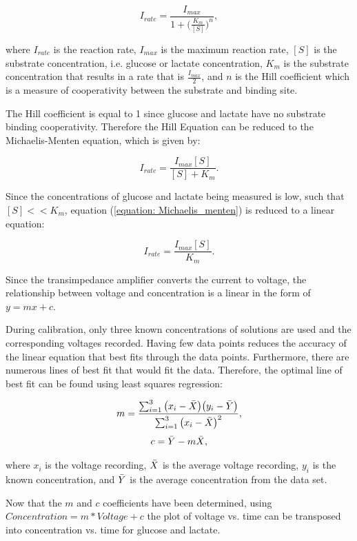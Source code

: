 \begin{equation}
    I_{rate} = \frac{I_{max}}{1 + \big( \frac{K_{m}}{[S]} \big)^{n}},
    \label{equation: Hill equation}
\end{equation}

\noindent where $I_{rate}$ is the reaction rate, $I_{max}$ is the maximum reaction rate, $[S]$ is the substrate concentration, i.e. glucose or lactate concentration, $K_{m}$ is the substrate concentration that results in a rate that is $\frac{I_{max}}{2}$, and $n$ is the Hill coefficient which is a measure of cooperativity between the substrate and binding site.

The Hill coefficient is equal to 1 since glucose and lactate have no substrate binding cooperativity. Therefore the Hill Equation can be reduced to the Michaelis-Menten equation, which is given by:

\begin{equation}
    I_{rate} = \frac{I_{max}[S]}{[S] + K_{m}}.
    \label{equation: Michaelis_menten}
\end{equation}

Since the concentrations of glucose and lactate being measured is low, such that $[S] << K_{m}$, equation (\ref{equation: Michaelis_menten}) is reduced to a linear equation:

\begin{equation}
    I_{rate} = \frac{I_{max}[S]}{K_{m}}.
    \label{equation: reduced Michaelis_menten}
\end{equation}

\noindent Since the transimpedance amplifier converts the current to voltage, the relationship between voltage and concentration is a linear in the form of $y = mx + c$.

During calibration, only three known concentrations of solutions are used and the corresponding voltages recorded. Having few data points reduces the accuracy of the linear equation that best fits through the data points. Furthermore, there are numerous lines of best fit that would fit the data. Therefore, the optimal line of best fit can be found using least squares regression:

\begin{equation}
    m = \frac{ \sum_{i=1}^{3} \big( x_{i} - \Bar{X} \big) \big( y_{i} - \Bar{Y} \big) }{ \sum_{i=1}^{3} \big( x_{i} - \Bar{X} \big)^{2} },
    \label{equation: least squares regression}
\end{equation}
\begin{equation}
    c = \Bar{Y} - m\Bar{X},
\end{equation}

\noindent where $x_{i}$ is the voltage recording, $\Bar{X}$ is the average voltage recording, $y_i$ is the known concentration, and $\Bar{Y}$ is the average concentration from the data set. 

Now that the $m$ and $c$ coefficients have been determined, using $Concentration = m*Voltage + c$ the plot of voltage vs. time can be transposed into concentration vs. time for glucose and lactate.


